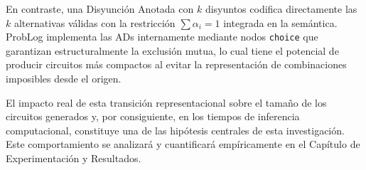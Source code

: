En contraste, una Disyunción Anotada con $k$ disyuntos codifica directamente las $k$ alternativas válidas con la restricción $\sum \alpha_i = 1$ integrada en la semántica. ProbLog implementa las ADs internamente mediante nodos \texttt{choice} que garantizan estructuralmente la exclusión mutua, lo cual tiene el potencial de producir circuitos más compactos al evitar la representación de combinaciones imposibles desde el origen.

El impacto real de esta transición representacional sobre el tamaño de los circuitos generados y, por consiguiente, en los tiempos de inferencia computacional, constituye una de las hipótesis centrales de esta investigación. Este comportamiento se analizará y cuantificará empíricamente en el Capítulo de Experimentación y Resultados.


